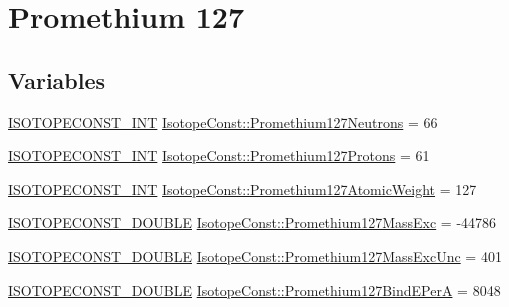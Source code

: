 \hypertarget{group___isotope_const-_promethium-_pm127}{}\section{Promethium 127}
\label{group___isotope_const-_promethium-_pm127}
\subsection*{Variables}
\begin{DoxyCompactItemize}
\item 
\mbox{\hyperlink{group___isotope_const-_macros_ga5f18360b3e99483a35c32d789e62621c}{I\+S\+O\+T\+O\+P\+E\+C\+O\+N\+S\+T\+\_\+\+I\+NT}} \mbox{\hyperlink{group___isotope_const-_promethium-_pm127_gabc3bae6560ab392f4ce71a04b548930c}{Isotope\+Const\+::\+Promethium127\+Neutrons}} = 66
\item 
\mbox{\hyperlink{group___isotope_const-_macros_ga5f18360b3e99483a35c32d789e62621c}{I\+S\+O\+T\+O\+P\+E\+C\+O\+N\+S\+T\+\_\+\+I\+NT}} \mbox{\hyperlink{group___isotope_const-_promethium-_pm127_ga15eee155c59fa482ba6535af63d4ed89}{Isotope\+Const\+::\+Promethium127\+Protons}} = 61
\item 
\mbox{\hyperlink{group___isotope_const-_macros_ga5f18360b3e99483a35c32d789e62621c}{I\+S\+O\+T\+O\+P\+E\+C\+O\+N\+S\+T\+\_\+\+I\+NT}} \mbox{\hyperlink{group___isotope_const-_promethium-_pm127_ga92b1c2137a0c5a442eeab72cd3259239}{Isotope\+Const\+::\+Promethium127\+Atomic\+Weight}} = 127
\item 
\mbox{\hyperlink{group___isotope_const-_macros_ga8f45a7272ce02c0b4c65c44636ed719a}{I\+S\+O\+T\+O\+P\+E\+C\+O\+N\+S\+T\+\_\+\+D\+O\+U\+B\+LE}} \mbox{\hyperlink{group___isotope_const-_promethium-_pm127_ga12c618d8406d4ec367de1925860785ff}{Isotope\+Const\+::\+Promethium127\+Mass\+Exc}} = -\/44786
\item 
\mbox{\hyperlink{group___isotope_const-_macros_ga8f45a7272ce02c0b4c65c44636ed719a}{I\+S\+O\+T\+O\+P\+E\+C\+O\+N\+S\+T\+\_\+\+D\+O\+U\+B\+LE}} \mbox{\hyperlink{group___isotope_const-_promethium-_pm127_ga92eadd91036a4d0863725507d2215783}{Isotope\+Const\+::\+Promethium127\+Mass\+Exc\+Unc}} = 401
\item 
\mbox{\hyperlink{group___isotope_const-_macros_ga8f45a7272ce02c0b4c65c44636ed719a}{I\+S\+O\+T\+O\+P\+E\+C\+O\+N\+S\+T\+\_\+\+D\+O\+U\+B\+LE}} \mbox{\hyperlink{group___isotope_const-_promethium-_pm127_ga07bc0eecc2d0e317b4fb77ad9a677d20}{Isotope\+Const\+::\+Promethium127\+Bind\+E\+PerA}} = 8048
\item 

\end{DoxyCompactItemize}
